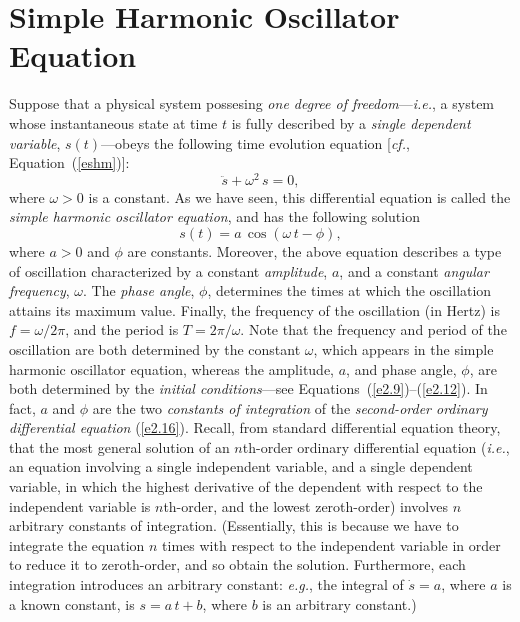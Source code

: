 \section{Simple Harmonic Oscillator Equation}
Suppose that a physical system possesing {\em one degree of freedom}---{\em i.e.}, a
system whose instantaneous state at time $t$ is fully described by a {\em single dependent variable}, $s(t)$---obeys the following time evolution equation [{\em cf.}, Equation~(\ref{eshm})]:
\begin{equation}\label{e2.16}
\ddot{s}+ \omega^2\,s=0,
\end{equation}
where $\omega>0$ is a  constant.  As we have seen, this differential
equation is called the {\em simple harmonic oscillator equation}, and has the
following  solution
\begin{equation}\label{e2.17}
s(t) = a\,\cos(\omega\,t-\phi),
\end{equation}
where $a>0$ and $\phi$ are constants. Moreover, the above equation describes a type of oscillation
characterized by a constant {\em amplitude}, $a$, and a constant {\em angular frequency}, $\omega$.
The {\em phase angle}, $\phi$, determines the times at which the oscillation attains its
maximum value. Finally, the frequency of the oscillation (in Hertz) is $f=\omega/2\pi$,
and the period is $T=2\pi/\omega$. Note that the frequency and period of the
oscillation are both determined by the constant $\omega$, which appears in the simple harmonic oscillator equation, whereas the amplitude, $a$, and phase angle, $\phi$, are both determined by the {\em initial conditions}---see Equations~(\ref{e2.9})--(\ref{e2.12}). In fact, $a$ and $\phi$ are the two {\em constants of integration}\/ of the
{\em second-order ordinary differential equation}\/ (\ref{e2.16}). Recall, from standard differential equation theory, that the
most general solution of an $n$th-order ordinary differential equation ({\em i.e.},
an equation involving a single independent variable, and a single dependent variable, in which the highest derivative of the dependent  with respect to the
independent variable is
$n$th-order, and the lowest zeroth-order) involves $n$ arbitrary constants of integration. (Essentially, this is because
we have to integrate the equation $n$ times with respect to the independent variable in order to reduce it to zeroth-order, and so
obtain the solution. Furthermore, each integration introduces an arbitrary constant: {\em e.g.},
the integral of $\dot{s}=a$, where $a$ is a known constant, is $s=a\,t+b$, where $b$ is an arbitrary constant.)

